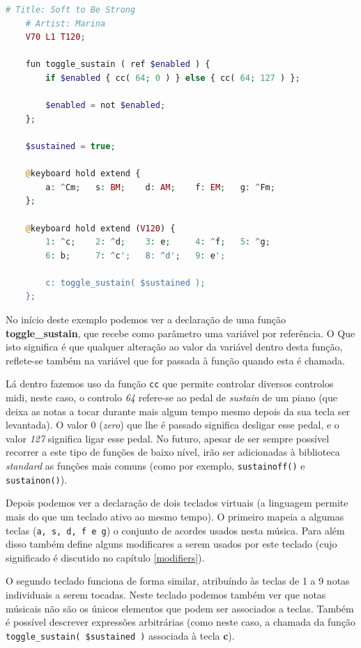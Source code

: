 \documentclass[
  oneside,
  11pt, a4paper,
  footinclude=true,
  headinclude=true,
  cleardoublepage=empty
]{scrbook}
\begin{document}
    \begin{lstlisting}[caption=Exemplo da sintaxe para criação de teclados,language=PHP]
    # Title: Soft to Be Strong
    # Artist: Marina
    V70 L1 T120;

    fun toggle_sustain ( ref $enabled ) {
        if $enabled { cc( 64; 0 ) } else { cc( 64; 127 ) };

        $enabled = not $enabled;
    };
    
    $sustained = true;
    
    @keyboard hold extend {
        a: ^Cm;   s: BM;    d: AM;    f: EM;   g: ^Fm;
    };
    
    @keyboard hold extend (V120) {
        1: ^c;    2: ^d;    3: e;     4: ^f;   5: ^g;
        6: b;     7: ^c';   8: ^d';   9: e';

        c: toggle_sustain( $sustained );
    };
    \end{lstlisting}
    
    No início deste exemplo podemos ver a declaração de uma função \textbf{toggle\_sustain}, que recebe como parâmetro uma variável por referência. O Que isto significa é que qualquer alteração ao valor da variável dentro desta função, reflete-se também na variável que for passada à função quando esta é chamada. 
    
    Lá dentro fazemos uso da função \texttt{cc} que permite controlar diversos controlos \acrshort{midi}, neste caso, o controlo \textit{64} refere-se ao pedal de \textit{sustain} de um piano (que deixa as notas a tocar durante mais algum tempo mesmo depois da sua tecla ser levantada). O valor 0 (\textit{zero}) que lhe é passado significa desligar esse pedal, e o valor \textit{127} significa ligar esse pedal. No futuro, apesar de ser sempre possível recorrer a este tipo de funções de baixo nível, irão ser adicionadas à biblioteca \textit{standard} as funções mais comuns (como por exemplo, \texttt{sustainoff()} e \texttt{sustainon()}).
    
    Depois podemos ver a declaração de dois teclados virtuais (a linguagem permite mais do que um teclado ativo ao mesmo tempo). O primeiro mapeia a algumas teclas (\texttt{a, s, d, f e g}) o conjunto de acordes usados nesta música. Para além disso também define alguns modificares a serem usados por este teclado (cujo significado é discutido no capítulo \ref{modifiers}).
    
    O segundo teclado funciona de forma similar, atribuíndo às teclas de 1 a 9 notas individuais a serem tocadas. Neste teclado podemos também ver que notas músicais não são os únicos elementos que podem ser associados a teclas. Também é possível descrever expressões arbitrárias (como neste caso, a chamada da função \texttt{toggle\_sustain( \$sustained )} associada à tecla \textbf{c}).
    
\end{document}
